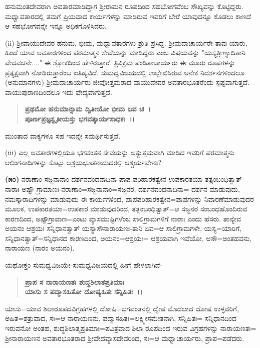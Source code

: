 ಹನುಮಂತದೇವರಾಗಿ ಅವತಾರಮಾಡಿದ್ದಾಗ ಶ‍್ರೀರಾಮನ ರೂಪದಿಂದ ಸಹಭೋಗವೆಂಬ ಸೌಖ್ಯವನ್ನು ಕೊಟ್ಟಿದ್ದರು. ಮಧ್ವಾವತಾರದಲ್ಲಿ ತಮಗೆ ಪ್ರಿಯವಾದ ಕಾರ್ಯಗಳನ್ನು ಮಾಡಿರುವ ಇವರಿಗೆ ಬೇರೆ ಯಾವುದನ್ನೂ ಕೊಡಲು ಕಾಣದೆ ಆ ಸಹಭೋಗವನ್ನೇ ಇನ್ನೂ ಅಧಿಕಗೊಳಿಸಿದರು.

(ii) ಶ‍್ರೀವಾಯುದೇವರ ಹನುಮ, ಭೀಮ, ಮಧ್ವಾವತಾರಗಳು ಶ್ರುತಿ ಪ್ರಸಿದ್ದ. ಶ‍್ರೀಮದಾಚಾರ್ಯರೇ ತಾವು ಯಾರು, ಹಿಂದೆ ಯಾವ ಅವತಾರಗಳಿಂದ ಪರಮಾತ್ಮನ ಸೇವೆಯನ್ನು ಮಾಡಿದ್ದರು ಎಂಬ ವಿಷಯವನ್ನು "ಯಸ್ಯತ್ರೀಣ್ಯುದಿತಾನಿ ವೇದವಚನೇ...." ಈ ಶ್ಲೋಕದಿಂದ ಹೇಳಿರುತ್ತಾರೆ. ತ್ರಿವಿಕ್ರಮ ಪಂಡಿತಾಚಾರ್ಯರು ಈ ಮೂರು ರೂಪಗಳನ್ನು ಪ್ರತ್ಯಕ್ಷವಾಗಿ ನೋಡಿರುತ್ತಾರೆಂಬ ಐತಿಹ್ಯವಿದೆ. ಸುಮಧ್ವವಿಜಯದಲ್ಲಿ ಉಲ್ಲೇಖಿಸಿರುವ ಅನೇಕ ನಿದರ್ಶನಗಳಿಂದಲೂ (ಅನುಮಾನಗಳು) ಶ‍್ರೀಮದಾಚಾರ್ಯರು ಜೀವೋತ್ತಮರಾದ ವಾಯುದೇವರ ಅವತಾರಭೂತರೆಂದು ಸ್ಪಷ್ಟವಾಗುತ್ತದೆ. ವಾಯುಪುರಾಣದಿಂದಲೂ ಇದು ವೇದ್ಯವಾಗುತ್ತದೆ.

\begin{verse}
\textbf{ ಪ್ರಥಮೋ ಹನುಮಾನ್ನಾಮ ದ್ವಿತೀಯೋ ಭೀಮ ಏವ ಚ~।}\\\textbf{ಪೂರ್ಣಪ್ರಜ್ಞಸ್ಟೃತೀಯಸ್ತು ಭಗವತ್ಕಾರ್ಯಸಾಧಕಃ~।।}
\end{verse}

\noindent
ಮುಂತಾದ ವಾಕ್ಯಗಳೂ ಸಹ ಇದನ್ನೇ ಸಮರ್ಥಿಸುತ್ತವೆ.

(iii) ಎಲ್ಲ ಅವತಾರಗಳಲ್ಲಿಯೂ ಭಗವಂತನ ಸೇವೆಯನ್ನು ಅತ್ಯುತ್ತಮವಾಗಿ ಮಾಡಿದ ಇವರಿಗೆ ಪರಮಾತ್ಮನು ಆಲಿಂಗನಾದಿಗಳನ್ನು ಕೊಟ್ಟು ಆಶ್ರಯಭೂತನಾದುದರಲ್ಲಿ ಆಶ್ಚರ್ಯವೇನು?

\textbf{(೫೦)} ನರಾಣಾಂ ಸಜ್ಜನಾನಾಂ ದರ್ಶನವಂದನಾದಿನಾ ಪಾಪ ಪರಿಹಾರಕತ್ವೇನ ಉಪಕಾರತಯಾ ತತ್ಸಂಬಂಧಿತ್ವಾತ್ ನಾರಾಃ ಅಷ್ಟೌ ಗ್ರಾಮಾಣಃ-ನರಾಣಾಂ=ಸಜ್ಜನಾನಾಂ=ಸಜ್ಜನರ, ದರ್ಶನವಂದನಾದಿನಾ= ದರ್ಶನ ಮಾಡುವುದು, ನಮಸ್ಕಾರಾದಿಗಳನ್ನು ಮಾಡುವುದು ಈ ಕಾರ್ಯಗಳಿಂದ, ಪಾಪಪರಿಹಾರಕತ್ವೇನ=ಪಾಪಗಳನ್ನು ನಿವಾರಣೆಮಾಡುವುದರ ಮೂಲಕ, ಉಪಕಾರತಯಾ=ಉಪಕಾರ ಮಾಡುವುದರಿಂದ, ತತ್ಸಂಬಂಧಿತ್ವಾತ್=ಆ ಸಜ್ಜನರ ಸಂಬಂಧಹೊಂದಿರುವ ಕಾರಣದಿಂದ, ಅಷ್ಟೌಗ್ರಾವಾಣ=ಎಂಟು ವ್ಯಾಸಮುಷ್ಟಿಗಳೆಂಬ ಸಾಲಿಗ್ರಾಮಗಳಿಗೆ ನಾರಾಃ ಎಂದು ಹೆಸರು. ತಾನ್ಯೇವ ಅಯನಂ ಆಶ್ರಯಃ ಸನ್ನಿಧಾನತ್ವಾತ್ ಯಸ್ಯಾಸೌ\break ನಾರಾಯಣಃ-ತಾನಿ ಏವ=ಆ ಸಾಲಿಗ್ರಾಮಗಳೇ, ಯಸ್ಯ=ಯಾರಿಗೆ, ಸನ್ನಿಧಾನತ್ವಾತ್=\-ಸನ್ನಿಧಾನದ ಕಾರಣದಿಂದ, ಅಯನಂ=ಆಶ್ರಯಃ= ಆಶ್ರಯವಾಗಿ ಇವೆಯೋ, ಅಸೌ=\-ಅಂತಹವನು, ನಾರಾಯಣ (ನಾರಂ ಅಯನಂ).

ಯಥೋಕ್ತಂ ಸುಮಧ್ವವಿಜಯೇ-ಸುಮಧ್ವವಿಜಯದಲ್ಲಿ ಹೀಗೆ ಹೇಳಲಾಗಿದೆ-

\begin{verse}
\textbf{ಪ್ರಾಪ ಸ ನಾರಾಯಣತಃ ಶುದ್ಧಶಿಲಾತಪ್ರತಿಮಾಃ} \\\textbf{ಯಾಸು ಸ ಪದ್ಮಾಸಹಿತೋ ದೋಷ್ಯಹಿತಃ ಸನ್ನಿಹಿತಃ~।।}
\end{verse}

ಯಾಸು=ಯಾವ ಶಿಲಾರೂಪದವಿಗ್ರಹಗಳಲ್ಲಿ ದೋಷಿ=ಭಗವಂತನಲ್ಲಿ ದ್ವೇಷ ಮೊದಲಾದ ದೋಷ ಉಳ್ಳವರಿಗೆ, ಅಹಿತ=ಶತ್ರುವಾದ, ಸಃ=ಆ ನಾರಾಯಣನು, ಪದ್ಮಾಸಹಿತಃ=ಲಕ್ಷ್ಮೀ\-ಸಮೇತನಾಗಿ, ಸನ್ನಿಹಿತಃ= ಸನ್ನಿಧಾನದಿಂದ ಇರುವನೋ ಅಂತಹ, ಶುದ್ಧಶಿಲಾತ್ಮಪ್ರತಿಮಾಃ=\-ಪವಿತ್ರವಾದ ಶಿಲಾ ರೂಪದಿಂದ ಇರುವ ವಿಗ್ರಹಗಳನ್ನು ನಾರಾಯಣತಃ= ಶ‍್ರೀನಾರಾಯಣನ ಅವತಾರಭೂತರಾದ ಶ‍್ರೀವೇದವ್ಯಾಸದೇವರಿಂದ, ಸಃ=ಆ ಮಧ್ವಾಚಾರ್ಯರು, ಪ್ರಾಪ=\-ಪಡೆದರು.

